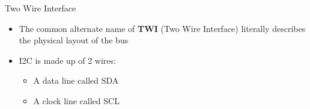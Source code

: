 \begin{frame}
   {Two Wire Interface}
   \begin{itemize}
      \item The common alternate name of \textbf{TWI} (Two Wire Interface)
	      literally describes the physical layout of the bus
      \item I2C is made up of 2 wires:
         \begin{itemize}
            \item A data line called SDA
            \item A clock line called SCL
         \end{itemize}
   \end{itemize}
\end{frame}

\cprotect\note{

}

